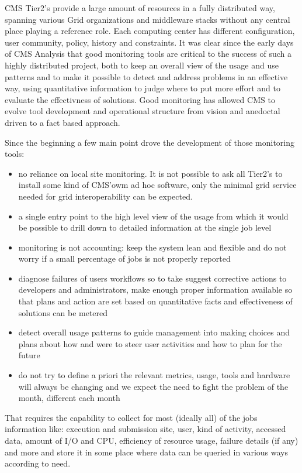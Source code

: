 
CMS Tier2's provide a large amount of resources in a fully distributed way,
spanning various
Grid organizations and middleware stacks
without any central place playing a reference role.
Each computing center has
different configuration, user community, policy, history and
constraints.
It was clear since the early days of CMS Analysis that
good monitoring tools are critical to the success of such
a highly distributed project, both to keep an overall
view of the usage and use patterns and to make it possible
to detect and address problems in an effective way,
using quantitative information to judge where to put
more effort and to evaluate the effectivness of solutions.
Good monitoring has allowed CMS to evolve tool development
and operational structure from vision and anedoctal driven
to a fact based approach.

Since the beginning a few main point drove the development of
those monitoring tools:
\begin{itemize}
\item no reliance on local site monitoring. It is not possible to ask
 all Tier2's to install some kind of CMS'owm ad hoc software, only the
 minimal grid service needed for grid interoperability can be expected.
\item a single entry point to the high level view of the usage from which
 it would be possible to drill down to detailed information at the single
  job level
\item  monitoring is not accounting: keep the system lean and
 flexible and do not worry if a small
 percentage of jobs is not properly reported
\item diagnose failures of users workflows so to
  take suggest corrective actions to developers and administrators, make
  enough proper information available so that plans and action are set
  based on quantitative facts and effectiveness of solutions can be metered
\item detect overall usage patterns to guide management into making
 choices and plans about how and were to steer user activities and
 how to plan for the future
\item do not try to define a priori the relevant metrics, usage, tools and
 hardware will always be changing and we expect the need to fight the
  problem of the month, different each month
\end{itemize}

That requires the capability to collect for most (ideally all) of the jobs
information like: execution and submission site, user, kind of activity,
accessed data, amount of I/O and CPU, efficiency of resource usage,
failure details (if any) and more and store it in some
place where data can be queried in various ways according to need.


